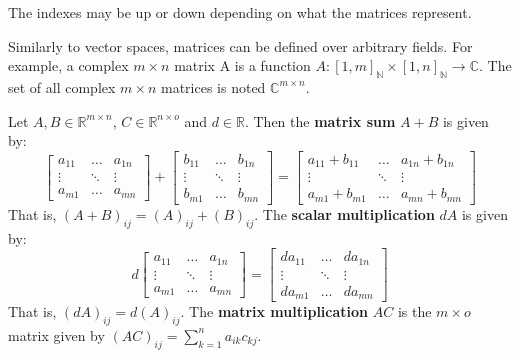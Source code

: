 \documentclass{bareminimum}
\begin{document}
	\begin{remark}
		The indexes may be up or down depending on what the matrices represent.
		
		Similarly to vector spaces, matrices can be defined over arbitrary fields. For example, a complex $m \times n$ matrix A is a function $A : [1,m]_{\mathbb{N}} \times [1,n]_{\mathbb{N}} \to \mathbb{C}$. The set of all complex $m \times n$ matrices is noted $\mathbb{C}^{m \times n}$.
	\end{remark}
	
	\begin{prop}
		Let $A,B \in \mathbb{R}^{m \times n}$, $C \in \mathbb{R}^{n \times o}$ and $d \in \mathbb{R}$. Then the \textbf{matrix sum} $A + B$ is given by:
		\begin{equation}
			\begin{bmatrix}
				a_{11} & \ldots & a_{1n} \\
				\vdots & \ddots & \vdots  \\
				a_{m1} & \ldots & a_{mn}
			\end{bmatrix}
			+
			\begin{bmatrix}
				b_{11} & \ldots & b_{1n} \\
				\vdots & \ddots & \vdots  \\
				b_{m1} & \ldots & b_{mn}
			\end{bmatrix}
			=
			\begin{bmatrix}
				a_{11} + b_{11} & \ldots & a_{1n} + b_{1n} \\
				\vdots & \ddots & \vdots  \\
				a_{m1} + b_{m1} & \ldots & a_{mn} + b_{mn}
			\end{bmatrix}
		\end{equation}
		That is, $(A+B)_{ij} = (A)_{ij} + (B)_{ij}$. The \textbf{scalar multiplication} $dA$ is given by:
		\begin{equation}
			d
			\begin{bmatrix}
				a_{11} & \ldots & a_{1n} \\
				\vdots & \ddots & \vdots  \\
				a_{m1} & \ldots & a_{mn}
			\end{bmatrix}
			=
			\begin{bmatrix}
				da_{11} & \ldots & da_{1n} \\
				\vdots & \ddots & \vdots  \\
				da_{m1} & \ldots & da_{mn}
			\end{bmatrix}
		\end{equation}
		That is, $(dA)_{ij} = d(A)_{ij}$. 
		The \textbf{matrix multiplication} $AC$ is the $m \times o$ matrix given by $(AC)_{ij} = \sum_{k=1}^{n} a_{ik}c_{kj}$.
	\end{prop}
	
\end{document}
